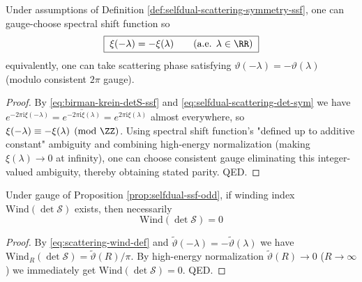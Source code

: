 \begin{proposition}\label{prop:selfdual-ssf-odd}
Under assumptions of Definition \ref{def:selfdual-scattering-symmetry-ssf}, one can gauge-choose spectral shift function so
\[
\boxed{\;\xi(-\lambda)=-\xi(\lambda)\qquad(\text{a.e. }\lambda\in\RR)\;}
\]
equivalently, one can take scattering phase satisfying \(\vartheta(-\lambda)=-\vartheta(\lambda)\) (modulo consistent \(2\pi\) gauge).
\end{proposition}

\begin{proof}
By \eqref{eq:birman-krein-detS-ssf} and \eqref{eq:selfdual-scattering-det-sym} we have
\(
e^{-2\pi\mathrm{i}\xi(-\lambda)}=\overline{e^{-2\pi\mathrm{i}\xi(\lambda)}}=e^{2\pi\mathrm{i}\xi(\lambda)}
\)
almost everywhere, so \(\xi(-\lambda)\equiv-\xi(\lambda)\pmod{\ZZ}\).
Using spectral shift function's "defined up to additive constant" ambiguity and combining high-energy normalization (making \(\xi(\lambda)\to 0\) at infinity), one can choose consistent gauge eliminating this integer-valued ambiguity, thereby obtaining stated parity. QED.
\end{proof}

\begin{proposition}\label{prop:selfdual-wind-vanish}
Under gauge of Proposition \ref{prop:selfdual-ssf-odd}, if winding index \(\mathrm{Wind}(\det\mathcal S)\) exists, then necessarily
\[
\boxed{\;\mathrm{Wind}(\det\mathcal S)=0\;}
\]
\end{proposition}

\begin{proof}
By \eqref{eq:scattering-wind-def} and \(\widetilde\vartheta(-\lambda)=-\widetilde\vartheta(\lambda)\) we have \(\mathrm{Wind}_R(\det\mathcal S)=\widetilde\vartheta(R)/\pi\).
By high-energy normalization \(\widetilde\vartheta(R)\to 0\) (\(R\to\infty\)) we immediately get \(\mathrm{Wind}(\det\mathcal S)=0\). QED.
\end{proof}

